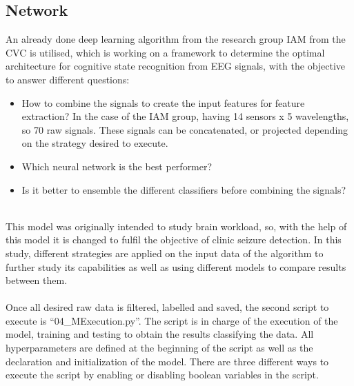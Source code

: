 \subsection{Network}
An already done deep learning algorithm from the research group IAM from the CVC is utilised, which is working on a framework to determine the optimal architecture for cognitive state recognition from EEG signals, with the objective to answer different questions:
\\
\begin{itemize}
  \item How to combine the signals to create the input features for feature extraction? In the case of the IAM group, having 14 sensors x 5 wavelengths, so 70 raw signals. These signals can be concatenated, or projected depending on the strategy desired to execute.
  \item Which neural network is the best performer?
  \item Is it better to ensemble the different classifiers before combining the signals?
\end{itemize}
\leavevmode\\
This model was originally intended to study brain workload, so, with the help of this model it is changed to fulfil the objective of clinic seizure detection. In this study, different strategies are applied on the input data of the algorithm to further study its capabilities as well as using different models to compare results between them.
\\\\
Once all desired raw data is filtered, labelled and saved, the second script to execute is “04\_MExecution.py”. The script is in charge of the execution of the model, training and testing to obtain the results classifying the data. All hyperparameters are defined at the beginning of the script as well as the declaration and initialization of the model. There are three different ways to execute the script by enabling or disabling boolean variables in the script. 
\\
